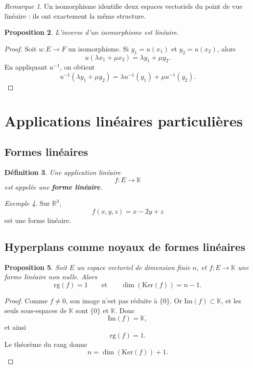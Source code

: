 \documentclass[11pt,a4paper]{article}
\newtheorem{definition}{Définition}[section]
\newtheorem{proposition}[definition]{Proposition}
\theoremstyle{remark}
\newtheorem{remarque}[definition]{Remarque}
\newtheorem{exemple}[definition]{Exemple}
\newcommand{\R}{\mathbb{R}}
\newcommand{\K}{\mathbb{K}}
\newcommand{\Ker}{\mathrm{Ker}}
\newcommand{\Img}{\mathrm{Im}}
\newcommand{\rg}{\mathrm{rg}}
\begin{document}
\begin{remarque}
Un isomorphisme identifie deux espaces vectoriels du point de vue linéaire : ils ont exactement la même structure.
\end{remarque}

\begin{proposition}
L’inverse d’un isomorphisme est linéaire.
\end{proposition}

\begin{proof}
Soit \(u:E\to F\) un isomorphisme. Si \(y_1=u(x_1)\) et \(y_2=u(x_2)\), alors
\[
u(\lambda x_1+\mu x_2)=\lambda y_1+\mu y_2.
\]
En appliquant \(u^{-1}\), on obtient
\[
u^{-1}(\lambda y_1+\mu y_2)=\lambda u^{-1}(y_1)+\mu u^{-1}(y_2).
\]
\end{proof}

\section{Applications linéaires particulières}

\subsection{Formes linéaires}

\begin{definition}
Une application linéaire
\[
f:E\to \K
\]
est appelée une \textbf{forme linéaire}.
\end{definition}

\begin{exemple}
Sur \(\R^3\),
\[
f(x,y,z)=x-2y+z
\]
est une forme linéaire.
\end{exemple}

\subsection{Hyperplans comme noyaux de formes linéaires}

\begin{proposition}
Soit \(E\) un espace vectoriel de dimension finie \(n\), et \(f:E\to\K\) une forme linéaire non nulle. Alors
\[
\rg(f)=1
\qquad \text{et} \qquad
\dim(\Ker(f))=n-1.
\]
\end{proposition}

\begin{proof}
Comme \(f\neq 0\), son image n’est pas réduite à \(\{0\}\). Or \(\Img(f)\subset \K\), et les seuls sous-espaces de \(\K\) sont \(\{0\}\) et \(\K\). Donc
\[
\Img(f)=\K,
\]
et ainsi
\[
\rg(f)=1.
\]
Le théorème du rang donne
\[
n=\dim(\Ker(f))+1.
\]
\end{proof}
\end{document}

